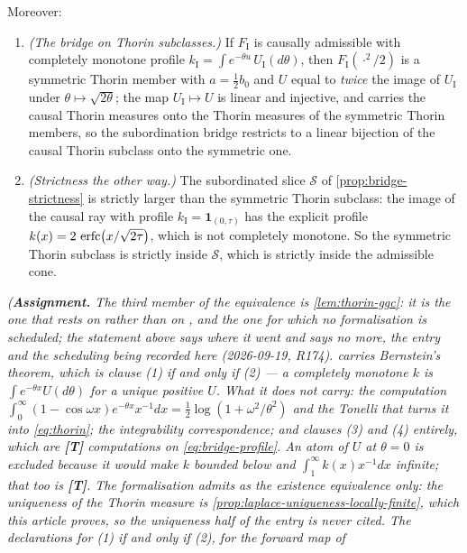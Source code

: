 \begin{proposition}
Moreover:
\begin{enumerate}
\item[(3)] \emph{(The bridge on Thorin subclasses.)} If $F_{\mathrm I}$ is causally admissible
with completely monotone profile $k_{\mathrm I} = \int e^{-\theta u}\,U_{\mathrm I}(d\theta)$,
then $F_{\mathrm I}(\cdot^2/2)$ is a symmetric Thorin member with $a = \tfrac12 b_0$ and $U$
equal to \emph{twice} the image of $U_{\mathrm I}$ under $\theta \mapsto \sqrt{2\theta}$; the
map $U_{\mathrm I} \mapsto U$ is linear and injective, and carries the causal Thorin measures
onto the Thorin measures of the symmetric Thorin members, so the subordination bridge restricts
to a linear bijection of the causal Thorin subclass onto the symmetric one.
\item[(4)] \emph{(Strictness the other way.)} The subordinated slice $\mathcal{S}$ of
\ref{prop:bridge-strictness} is strictly larger than the symmetric Thorin subclass: the image
of the causal ray with profile $k_{\mathrm I} = \mathbf 1_{(0,\tau)}$ has the explicit profile
$k(x) = 2\,\operatorname{erfc}\bigl(x/\sqrt{2\tau}\bigr)$, which is not completely monotone. So the symmetric
Thorin subclass is strictly inside $\mathcal{S}$, which is strictly inside the admissible cone.
\end{enumerate}
\statusA\quad{}\quad\emph{(\textbf{Assignment.} The third member of the equivalence is
\ref{lem:thorin-ggc}: it is the one that rests on  rather
than on , and the one for which no formalisation is scheduled; the statement above
says where it went and says no more, the entry and the scheduling being recorded here (2026-09-19,
R174).  carries
Bernstein's theorem, which is clause (1) if and only if (2) --- a completely monotone $k$ is
$\int e^{-\theta x}U(d\theta)$ for a unique positive $U$. What it does not carry: the computation
$\int_0^\infty (1-\cos\omega x)e^{-\theta x}x^{-1}dx = \tfrac12\log(1+\omega^2/\theta^2)$ and
the Tonelli that turns it into \ref{eq:thorin}; the integrability correspondence; and clauses
(3) and (4) entirely, which are \textbf{[T]} computations on \ref{eq:bridge-profile}. An atom
of $U$ at $\theta = 0$ is excluded because it would make $k$ bounded below and
$\int_1^\infty k(x)x^{-1}dx$ infinite; that too is \textbf{[T]}. The formalisation admits
 as the \emph{existence equivalence only}: the uniqueness of the Thorin measure is
\ref{prop:laplace-uniqueness-locally-finite}, which this article proves, so the uniqueness half of
the entry is never cited. The declarations for (1) if and only if (2), for the forward map of
}
\end{proposition}
